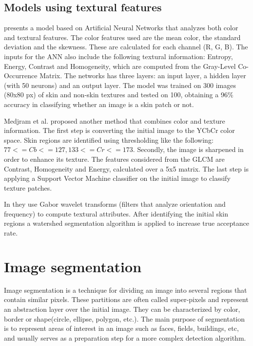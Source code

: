 \documentclass[12pt]{report}
\begin{document}
 	\subsection{Models using textural features}
 	\cite{color_texture_ann} presents a model based on Artificial Neural Networks that analyzes both color and textural features. The color features used are the mean color, the standard deviation and the skewness. These are calculated for each channel (R, G, B). The inputs for the ANN also include the following textural information: Entropy, Energy, Contrast and Homogeneity, which are computed from the Gray-Level Co-Occurrence Matrix. The networks has three layers: an input layer, a hidden layer (with 50 neurons) and an output layer. The model was trained on 300 images (80x80 px) of skin and non-skin textures and tested on 100, obtaining a 96\% accuracy in classifying whether an image is a skin patch or not.
 	
 	Medjram et al.\cite{texture_svm} proposed another method that combines color and texture information. The first step is converting the initial image to the YCbCr color space. Skin regions are identified using thresholding like the following: \(77 <= Cb <= 127, 133 <= Cr <= 173\). Secondly, the image is sharpened in order to enhance its texture. The features considered from the GLCM are Contrast, Homogeneity and Energy, calculated over a 5x5 matrix. The last step is applying a Support Vector Machine classifier on the initial image to classify texture patches.
 	
 	In \cite{texture_gabor_wavelet} they use Gabor wavelet transforms (filters that analyze orientation and frequency) to compute textural attributes. After identifying the initial skin regions a watershed segmentation algorithm is applied to increase true acceptance rate.
 	
	\section{Image segmentation}
	Image segmentation is a technique for dividing an image into several regions that contain similar pixels. These partitions are often called super-pixels and represent an abstraction layer over the initial image. They can be characterized by color, border or shape(circle, ellipse, polygon, etc.)\cite{computer_vision_book}. The main purpose of segmentation is to represent areas of interest in an image such as faces, fields, buildings, etc, and usually serves as a preparation step for a more complex detection algorithm.
	
\end{document}

